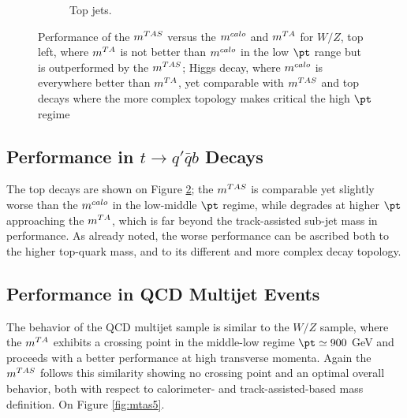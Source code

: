 \begin{figure}
\begin{subfigure}[b]{0.45\textwidth}
  \caption[$\mtas$ for boosted tops]{Top jets.}
  \label{fig:mtas3}
    \end{subfigure}%


    \caption[Performance of the $\mtas$ versus the $\mcal$ and $\mta$]{Performance of the $\mtas$ versus the $\mcal$ and $\mta$ for $W/Z$, top left, where $\mta$ is not better than $\mcal$ in the low $\pt$ range but is outperformed by the $\mtas$;  Higgs decay, where $\mcal$ is everywhere better than $\mta$, yet comparable with $\mtas$ and top decays where the more complex topology makes critical the high $\pt$ regime} 
\end{figure}


\subsection{Performance in $t\to q'\bar{q}b$ Decays}
The top decays are shown on Figure \ref{fig:mtas3}; the $\mtas$ is comparable yet slightly worse than the $\mcal$ in the low-middle $\pt$ regime, while degrades at higher $\pt$ approaching the $\mta$, which is far beyond the track-assisted sub-jet mass in performance.
As already noted, the worse performance can be ascribed both to the higher top-quark mass, and to its different and more complex decay topology.








\subsection{Performance in QCD Multijet Events}
The behavior of the QCD multijet sample is similar to the $W/Z$ sample, where the $\mta$ exhibits a crossing point in the middle-low regime $\pt\simeq900$ GeV and proceeds with a better performance at high transverse momenta.
Again the $\mtas$ follows this similarity showing no crossing point and an optimal overall behavior, both with respect to calorimeter- and track-assisted-based mass definition. On Figure \ref{fig:mtas5}.

